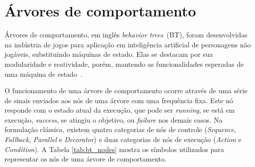 \documentclass[repeatfields,xlists,xpacks,oneside,yearsonly]{ufrgscca}
\begin{document}
\section{Árvores de comportamento}

Árvores de comportamento, em inglês \textit{behavior trees}~(BT), foram desenvolvidas
na indústria de jogos para aplicação em inteligência artificial de personagens
não jogáveis, substituindo máquinas de estado.
Elas se destacam por sua modularidade e reatividade, porém, mantendo as funcionalidades
esperadas de uma máquina de estado~\cite{BehaviorTree}.

O funcionamento de uma árvore de comportamento ocorre através de uma série de
sinais enviados aos nós de uma árvore com uma frequência fixa.
Este nó responde com o estado atual da execução, que pode ser \textit{running},
se está em execução, \textit{success}, se atingiu o objetivo, ou \textit{failure}
nos demais casos.
Na formulação clássica, existem quatro categorias de nós de controle (\textit{Sequence},
\textit{Fallback}, \textit{Parallel} e \textit{Decorator}) e duas categorias
de nós de execução (\textit{Action} e \textit{Condition}).
A Tabela \ref{tab:bt_nodes} mostra os símbolos utilizados para representar
os nós de uma árvore de comportamento.
\end{document}
